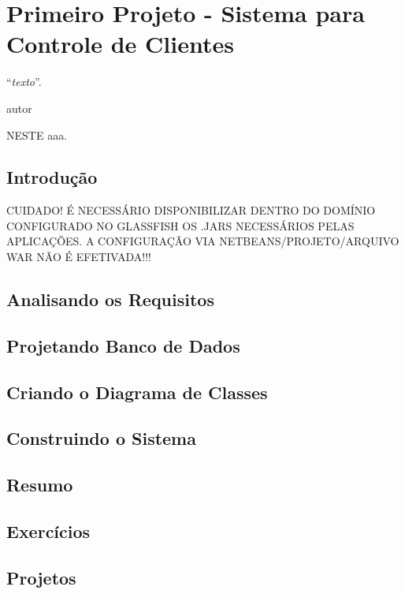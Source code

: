 \chapter{Primeiro Projeto - Sistema para Controle de Clientes}
\epigraph{``\textit{texto}''.}{autor}

\lettrine[lines=4, lhang=0.1, lraise=0, loversize=0.2, findent=0.1em]{\textcolor{corAzulTema}{N}}{ESTE} aaa.

\section{Introdução}

CUIDADO! É NECESSÁRIO DISPONIBILIZAR DENTRO DO DOMÍNIO CONFIGURADO NO GLASSFISH OS .JARS NECESSÁRIOS PELAS APLICAÇÕES. A CONFIGURAÇÃO VIA NETBEANS/PROJETO/ARQUIVO WAR NÃO É EFETIVADA!!!

\section{Analisando os Requisitos}

\section{Projetando Banco de Dados}

\section{Criando o Diagrama de Classes}

\section{Construindo o Sistema}

\section{Resumo}

\section{Exercícios}

\section{Projetos}